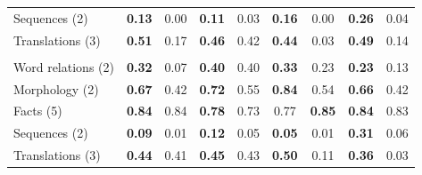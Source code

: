 \begin{tabular}{@{}lcccccccc@{}}
\quad Sequences (2) & \textbf{0.13} & 0.00 & \textbf{0.11} & 0.03 & \textbf{0.16} & 0.00 & \textbf{0.26} & 0.04 \\
\quad Translations (3) & \textbf{0.51} & 0.17 & \textbf{0.46} & 0.42 & \textbf{0.44} & 0.03 & \textbf{0.49} & 0.14 \\
\addlinespace
\multicolumn{9}{@{}l}{\textit{80 heads}} \\
\quad Word relations (2) & \textbf{0.32} & 0.07 & \textbf{0.40} & 0.40 & \textbf{0.33} & 0.23 & \textbf{0.23} & 0.13 \\
\quad Morphology (2) & \textbf{0.67} & 0.42 & \textbf{0.72} & 0.55 & \textbf{0.84} & 0.54 & \textbf{0.66} & 0.42 \\
\quad Facts (5) & \textbf{0.84} & 0.84 & \textbf{0.78} & 0.73 & 0.77 & \textbf{0.85} & \textbf{0.84} & 0.83 \\
\quad Sequences (2) & \textbf{0.09} & 0.01 & \textbf{0.12} & 0.05 & \textbf{0.05} & 0.01 & \textbf{0.31} & 0.06 \\
\quad Translations (3) & \textbf{0.44} & 0.41 & \textbf{0.45} & 0.43 & \textbf{0.50} & 0.11 & \textbf{0.36} & 0.03 \\
\bottomrule
\end{tabular}
